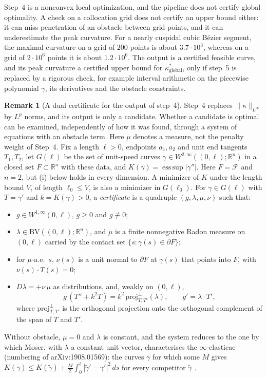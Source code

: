 \documentclass[11pt,reqno]{amsart}
\theoremstyle{definition}
\newtheorem{remark}[theorem]{Remark}
\providecommand{\R}{\mathbb{R}}
\numberwithin{equation}{section}
\providecommand{\R}{\mathbb{R}}
\providecommand{\BV}{\mathrm{BV}}
\begin{document}
Step~4 is a nonconvex local optimization, and the pipeline does not certify global optimality. A check on a collocation grid does not certify an upper bound either: it can miss penetration of an obstacle between grid points, and it can underestimate the peak curvature. For a nearly cuspidal cubic B\'ezier segment, the maximal curvature on a grid of $200$ points is about $3.7\cdot10^3$, whereas on a grid of $2\cdot10^6$ points it is about $1.2\cdot10^6$. The output is a certified feasible curve, and its peak curvature a certified upper bound for $\kappa^*_{\mathrm{global}}$, only if step~5 is replaced by a rigorous check, for example interval arithmetic on the piecewise polynomial $\gamma$, its derivatives and the obstacle constraints.

\begin{remark}[A dual certificate for the output of step~4]
\label{rem:dual_certificate}
Step~4 replaces $\|\kappa\|_{L^\infty}$ by $L^p$ norms, and its output is only a candidate. Whether a candidate is optimal can be examined, independently of how it was found, through a system of equations with an obstacle term. Here $\mu$ denotes a measure, not the penalty weight of Step~4. Fix a length $\ell > 0$, endpoints $a_1, a_2$ and unit end tangents $T_1, T_2$, let $G(\ell)$ be the set of unit-speed curves $\gamma \in W^{2,\infty}((0,\ell); \R^n)$ in a closed set $F \subset \R^n$ with these data, and $K(\gamma) = \operatorname{ess\,sup}|\gamma''|$. Here $F = \mathcal{F}$ and $n = 2$, but (i) below holds in every dimension. A minimizer of $K$ under the length bound $V$, of length $\ell_0 \le V$, is also a minimizer in $G(\ell_0)$. For $\gamma \in G(\ell)$ with $T = \gamma'$ and $k = K(\gamma) > 0$, a \emph{certificate} is a quadruple $(g, \lambda, \mu, \nu)$ such that:
\begin{itemize}
    \item $g \in W^{1,\infty}(0,\ell)$, $g \ge 0$ and $g \not\equiv 0$;
    \item $\lambda \in \BV((0,\ell); \R^n)$, and $\mu$ is a finite nonnegative Radon measure on $(0,\ell)$ carried by the contact set $\{s : \gamma(s) \in \partial F\}$;
    \item for $\mu$-a.e.\ $s$, $\nu(s)$ is a unit normal to $\partial F$ at $\gamma(s)$ that points into $F$, with $\nu(s) \cdot T(s) = 0$;
    \item $D\lambda = +\nu\,\mu$ as distributions, and, weakly on $(0,\ell)$,
    \[
    g\,(T'' + k^2 T) = k^2\,\mathrm{proj}^\perp_{T,T'}(\lambda), \qquad g' = \lambda \cdot T',
    \]
    where $\mathrm{proj}^\perp_{T,T'}$ is the orthogonal projection onto the orthogonal complement of the span of $T$ and $T'$.
\end{itemize}
Without obstacle, $\mu = 0$ and $\lambda$ is constant, and the system reduces to the one by which Moser, with $\lambda$ a constant unit vector, characterises the $\infty$-elasticae \cite[Theorem~2]{moser2022} (numbering of arXiv:1908.01569): the curves $\gamma$ for which some $M$ gives $K(\gamma) \le K(\tilde\gamma) + \tfrac{M}{2}\int_0^\ell|\tilde\gamma' - \gamma'|^2\,ds$ for every competitor $\tilde\gamma$ \cite[Definition~1]{moser2022}.


\end{remark}
\end{document}
